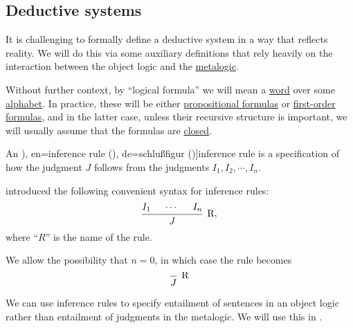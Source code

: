 \subsection{Deductive systems}\label{subsec:deductive_systems}

It is challenging to formally define a deductive system in a way that reflects reality. We will do this via some auxiliary definitions that rely heavily on the interaction between the object logic and the \hyperref[con:metalogic]{metalogic}.

Without further context, by \enquote{logical formula} we will mean a \hyperref[def:formal_language/word]{word} over some \hyperref[def:formal_language]{alphabet}. In practice, these will be either \hyperref[def:propositional_grammar_schema/formula]{propositional formulas} or \hyperref[def:first_order_syntax/formula]{first-order formulas}, and in the latter case, unless their recursive structure is important, we will usually assume that the formulas are \hyperref[def:first_order_syntax/closed_formula]{closed}.

\begin{definition}\label{con:inference_rule}\mimprovised
  An \term[ru=правило вывода (\cite[31]{Герасимов2011}), en=inference rule (\cite[34]{Kleene2002Logic}), de=schlu\ss{}figur (\cite[181]{Gentzen1935})]{inference rule} is a specification of how the judgment \( J \) follows from the judgments \( I_1, I_2, \cdots, I_n \).

   introduced the following convenient syntax for inference rules:
  \begin{equation*}
    \begin{prooftree}
      \hypo{ I_1 }
      \hypo{ \cdots }
      \hypo{ I_n }
      \infer3[R]{ J }
    \end{prooftree},
  \end{equation*}
  where \enquote{\( R \)} is the name of the rule.

  We allow the possibility that \( n = 0 \), in which case the rule becomes
  \begin{equation*}
    \begin{prooftree}
      \infer0[R]{ J }
    \end{prooftree}
  \end{equation*}
\end{definition}
\begin{comments}
  \item We can use inference rules to specify entailment of sentences in an object logic rather than entailment of judgments in the metalogic. We will use this in .
\end{comments}

